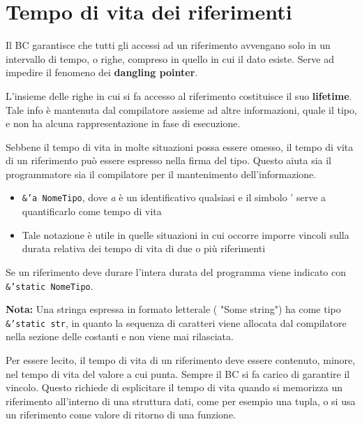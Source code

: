 \section{Tempo di vita dei riferimenti}
Il BC garantisce che tutti gli accessi ad un riferimento avvengano solo in un intervallo di tempo, o righe, compreso in quello in cui il dato esiste. Serve ad impedire il fenomeno dei \textbf{dangling pointer}.

L'insieme delle righe in cui si fa accesso al riferimento costituisce il suo \textbf{lifetime}. Tale info è mantenuta dal compilatore assieme ad altre informazioni, quale il tipo, e non ha alcuna rappresentazione in fase di esecuzione.\newline

Sebbene il tempo di vita in molte situazioni possa essere omesso, il tempo di vita di un riferimento può essere espresso nella firma del tipo. Questo aiuta sia il programmatore sia il compilatore per il mantenimento dell'informazione.

\begin{itemize}
  \item \texttt{&'a NomeTipo}, dove \textit{a} è un identificativo qualsiasi e il simbolo ' serve a quantificarlo come tempo di vita
  \item Tale notazione è utile in quelle situazioni in cui occorre imporre vincoli sulla durata relativa dei tempo di vita di due o più riferimenti
\end{itemize}

Se un riferimento deve durare l'intera durata del programma viene indicato con \\\texttt{&'static NomeTipo}.\newline

\begin{tcolorbox}
  \textbf{Nota:} Una stringa espressa in formato letterale ( "Some string") ha come tipo \texttt{&'static str}, in quanto la sequenza di caratteri viene allocata dal compilatore nella sezione delle costanti e non viene mai rilasciata.
\end{tcolorbox}


Per essere lecito, il tempo di vita di un riferimento deve essere contenuto, minore, nel tempo di vita del valore a cui punta. Sempre il BC si fa carico di garantire il vincolo.\newline
Questo richiede di esplicitare il tempo di vita quando si memorizza un riferimento all'interno di una struttura dati, come per esempio una tupla, o si usa un riferimento come valore di ritorno di una funzione.\newline

